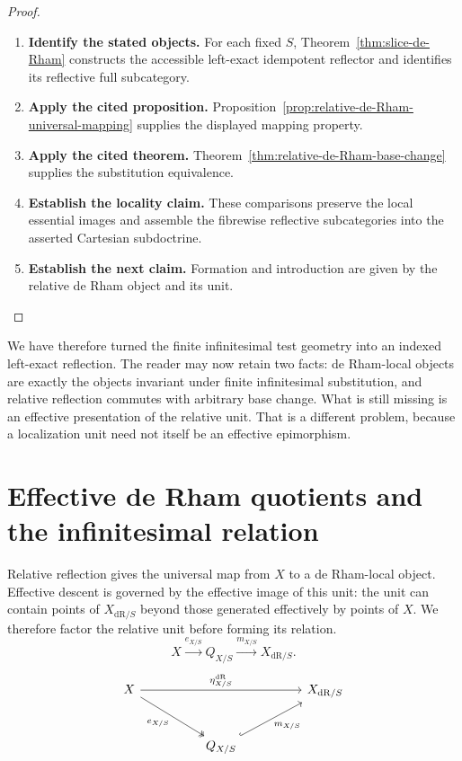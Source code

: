 \begin{proof}
\leavevmode
\begin{enumerate}[label=\textup{(\arabic*)}]
    \item \textbf{Identify the stated objects.}
    For each fixed \(S\), Theorem~\ref{thm:slice-de-Rham} constructs the accessible
    left-exact idempotent reflector and identifies its reflective full subcategory.
    \item \textbf{Apply the cited proposition.}
    Proposition~\ref{prop:relative-de-Rham-universal-mapping} supplies the displayed
    mapping property.
    \item \textbf{Apply the cited theorem.}
    Theorem~\ref{thm:relative-de-Rham-base-change} supplies the substitution
    equivalence.
    \item \textbf{Establish the locality claim.}
    These comparisons preserve the local essential images and assemble
    the fibrewise reflective subcategories into the asserted Cartesian subdoctrine.
    \item \textbf{Establish the next claim.}
    Formation and introduction are given by the relative de Rham object and its unit.
\end{enumerate}
\end{proof}


We have therefore turned the finite infinitesimal test geometry into an
indexed left-exact reflection. The reader may now retain two facts:
de Rham-local objects are exactly the objects invariant under finite
infinitesimal substitution, and relative reflection commutes with arbitrary
base change. What is still missing is an effective presentation of the
relative unit. That is a different problem, because a localization unit need
not itself be an effective epimorphism.
\section{Effective de Rham quotients and the infinitesimal relation}
\label{sec:de-Rham-factorization-equality}

Relative reflection gives the universal map from \(X\) to a de Rham-local object.
Effective descent is governed by the effective image of this unit: the unit can
contain points of \(X_{\mathrm{dR}/S}\) beyond those generated effectively by
points of \(X\). We therefore factor the relative unit before forming its
relation.
\[
  X\xrightarrow{e_{X/S}}Q_{X/S}
   \xrightarrow{m_{X/S}}X_{\mathrm{dR}/S}.
\]
\[
\begin{tikzcd}[column sep=huge,row sep=large]
  X
    \arrow[rr,"\eta_{X/S}^{\mathrm{dR}}"]
    \arrow[dr,two heads,"e_{X/S}"']
  &&
  X_{\mathrm{dR}/S}
  \\
  &
  Q_{X/S}
    \arrow[ur,hook,"m_{X/S}"']
  &
\end{tikzcd}
\]

